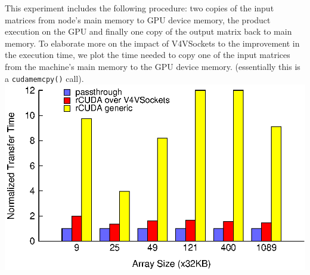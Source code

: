 \documentclass[a0paper,portrait,final]{baposter}
\begin{document}
\begin{poster}
{\begin{multicols}{2}
\vspace{0.5em}
\vspace{0.5em}
This experiment includes the following procedure: two copies of the input
matrices from node's main memory to GPU device memory, the product execution on
the GPU and finally one copy of the output matrix back to main memory. %
To elaborate more on the impact of V4VSockets to the improvement in the
execution time, we plot the time needed to copy one of the input
matrices from the machine's main memory to the GPU device memory. (essentially
this is a \texttt{cudamemcpy()} call).
\vspace{0.5em}
\includegraphics[width=\linewidth]{figures/matrixA_cublas_throughput.eps}
\end{multicols}


\vspace{1em}
}
\end{poster}
\end{document}
